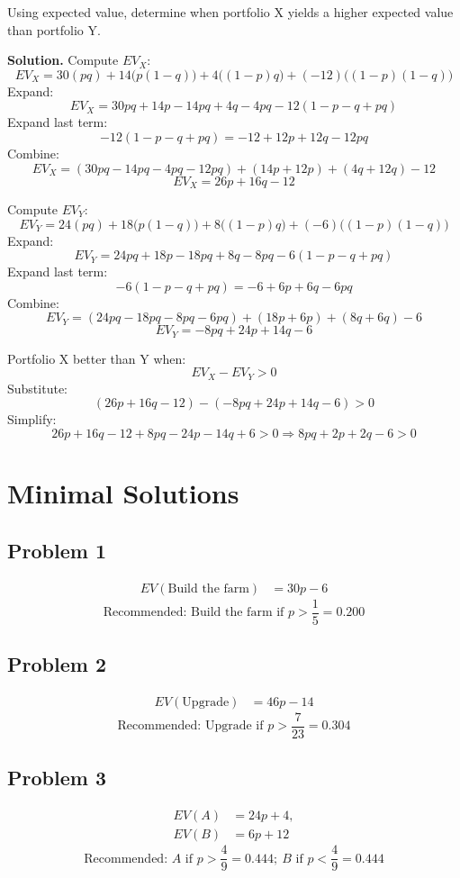 \begin{ExamProblems}
		Using expected value, determine when portfolio X yields a higher expected value than portfolio Y.
		
		\textbf{Solution.}
		Compute \(EV_X\):
		\[
		EV_X=30(pq)+14\bigl(p(1-q)\bigr)+4\bigl((1-p)q\bigr)+(-12)\bigl((1-p)(1-q)\bigr)
		\]
		Expand:
		\[
		EV_X=30pq + 14p - 14pq + 4q - 4pq - 12(1-p-q+pq)
		\]
		Expand last term:
		\[
		-12(1-p-q+pq)=-12 + 12p + 12q - 12pq
		\]
		Combine:
		\[
		EV_X=(30pq-14pq-4pq-12pq) + (14p+12p) + (4q+12q) - 12
		\]
		\[
		EV_X=26p + 16q - 12
		\]
		
		Compute \(EV_Y\):
		\[
		EV_Y=24(pq)+18\bigl(p(1-q)\bigr)+8\bigl((1-p)q\bigr)+(-6)\bigl((1-p)(1-q)\bigr)
		\]
		Expand:
		\[
		EV_Y=24pq + 18p - 18pq + 8q - 8pq - 6(1-p-q+pq)
		\]
		Expand last term:
		\[
		-6(1-p-q+pq)=-6 + 6p + 6q - 6pq
		\]
		Combine:
		\[
		EV_Y=(24pq-18pq-8pq-6pq) + (18p+6p) + (8q+6q) - 6
		\]
		\[
		EV_Y=-8pq + 24p + 14q - 6
		\]
		
		Portfolio X better than Y when:
		\[
		EV_X-EV_Y>0
		\]
		Substitute:
		\[
		(26p+16q-12)-(-8pq+24p+14q-6)>0
		\]
		Simplify:
		\[
		26p+16q-12+8pq-24p-14q+6>0
		\Rightarrow 8pq+2p+2q-6>0
		\]
		
	\end{ExamProblems}



\section{Minimal Solutions}
\subsection*{Problem 1}
\[
\begin{aligned}
	EV(\text{Build the farm}) &= 30p-6
\end{aligned}
\]
\[
\text{Recommended: } \text{Build the farm if } p>\frac{1}{5}=0.200
\]

\subsection*{Problem 2}
\[
\begin{aligned}
	EV(\text{Upgrade}) &= 46p-14
\end{aligned}
\]
\[
\text{Recommended: } \text{Upgrade if } p>\frac{7}{23}=0.304
\]

\subsection*{Problem 3}
\[
\begin{aligned}
	EV(A) &= 24p+4,\\
	EV(B) &= 6p+12
\end{aligned}
\]
\[
\text{Recommended: } A \text{ if } p>\frac{4}{9}=0.444;\ B \text{ if } p<\frac{4}{9}=0.444
\]

